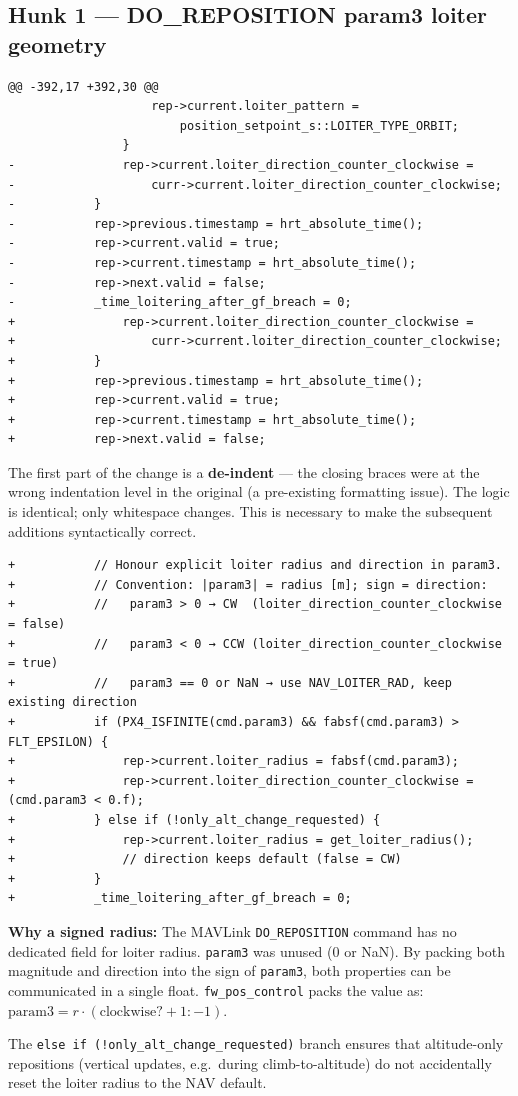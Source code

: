 \documentclass[12pt,a4paper]{article}
\begin{document}
\subsection{Hunk 1 — DO\_REPOSITION param3 loiter geometry}

\begin{lstlisting}[style=diff]
@@ -392,17 +392,30 @@
					rep->current.loiter_pattern =
					    position_setpoint_s::LOITER_TYPE_ORBIT;
				}
-				rep->current.loiter_direction_counter_clockwise =
-				    curr->current.loiter_direction_counter_clockwise;
-			}
-			rep->previous.timestamp = hrt_absolute_time();
-			rep->current.valid = true;
-			rep->current.timestamp = hrt_absolute_time();
-			rep->next.valid = false;
-			_time_loitering_after_gf_breach = 0;
+				rep->current.loiter_direction_counter_clockwise =
+				    curr->current.loiter_direction_counter_clockwise;
+			}
+			rep->previous.timestamp = hrt_absolute_time();
+			rep->current.valid = true;
+			rep->current.timestamp = hrt_absolute_time();
+			rep->next.valid = false;
\end{lstlisting}
\begin{annotation}The first part of the change is a \textbf{de-indent} — the closing braces were at the wrong indentation level in the original (a pre-existing formatting issue). The logic is identical; only whitespace changes. This is necessary to make the subsequent additions syntactically correct.\end{annotation}

\begin{lstlisting}[style=diff]
+			// Honour explicit loiter radius and direction in param3.
+			// Convention: |param3| = radius [m]; sign = direction:
+			//   param3 > 0 → CW  (loiter_direction_counter_clockwise = false)
+			//   param3 < 0 → CCW (loiter_direction_counter_clockwise = true)
+			//   param3 == 0 or NaN → use NAV_LOITER_RAD, keep existing direction
+			if (PX4_ISFINITE(cmd.param3) && fabsf(cmd.param3) > FLT_EPSILON) {
+				rep->current.loiter_radius = fabsf(cmd.param3);
+				rep->current.loiter_direction_counter_clockwise = (cmd.param3 < 0.f);
+			} else if (!only_alt_change_requested) {
+				rep->current.loiter_radius = get_loiter_radius();
+				// direction keeps default (false = CW)
+			}
+			_time_loitering_after_gf_breach = 0;
\end{lstlisting}
\begin{annotation}\textbf{Why a signed radius:} The MAVLink \texttt{DO\_REPOSITION} command has no dedicated field for loiter radius. \texttt{param3} was unused (0 or NaN). By packing both magnitude and direction into the sign of \texttt{param3}, both properties can be communicated in a single float. \texttt{fw\_pos\_control} packs the value as: $\text{param3} = r \cdot (\text{clockwise} ? +1 : -1)$.

The \texttt{else if (!only\_alt\_change\_requested)} branch ensures that altitude-only repositions (vertical updates, e.g.\ during climb-to-altitude) do not accidentally reset the loiter radius to the NAV default.\end{annotation}
\end{document}
